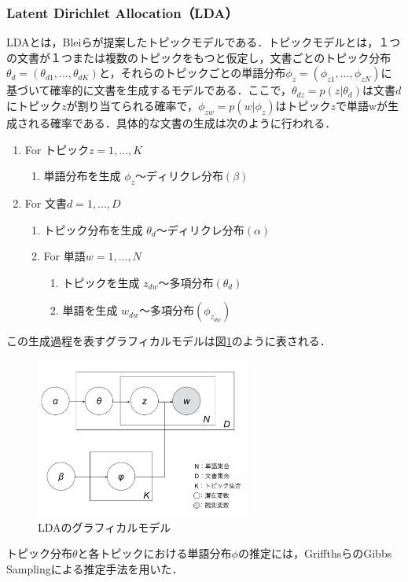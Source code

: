 \documentclass[a4paper,11pt,oneside,openany]{jsbook}
\begin{document}
		\subsubsection{Latent Dirichlet Allocation（LDA）}
LDA\cite{Blei}とは，Bleiらが提案したトピックモデルである．トピックモデルとは，１つの文書が１つまたは複数のトピックをもつと仮定し，文書ごとのトピック分布$\theta_{d} = (\theta_{d1},...,\theta_{dK})$と，それらのトピックごとの単語分布$\phi_{z} = (\phi_{z1},...,\phi_{zN})$に基づいて確率的に文書を生成するモデルである．ここで，$\theta_{dz} = p(z|\theta_{d})$は文書$d$にトピック$z$が割り当てられる確率で，$\phi_{zw} = p(w|\phi_{z})$はトピック$z$で単語wが生成される確率である．具体的な文書の生成は次のように行われる．
\begin{enumerate}
\item For トピック$z = 1, ... , K$
	\begin{enumerate}
	\setlength{\itemindent}{2cm}
 	\item 単語分布を生成 $\phi_{z} 〜 ディリクレ分布(\beta)$
	\end{enumerate}
\item For 文書$d = 1, ... ,D$
	\begin{enumerate}
	\setlength{\itemindent}{2cm}
 	\item トピック分布を生成 $\theta_{d} 〜 ディリクレ分布(\alpha)$
	\setlength{\itemindent}{2cm}
 	\item For 単語$w = 1, ... ,N$
		\begin{enumerate}
		\setlength{\itemindent}{3cm}
		\item トピックを生成 $z_{dw} 〜 多項分布(\theta_{d})$
		\setlength{\itemindent}{3cm}
		\item 単語を生成 $w_{dw} 〜 多項分布(\phi_{z_{dw}})$
		\end{enumerate}
	\end{enumerate}


\end{enumerate}

この生成過程を表すグラフィカルモデルは図\ref{fig:lda}のように表される．
\begin{figure}[tb]
	\begin{center} %
		\includegraphics[width = 70mm]{figures/LDA.pdf} %
	\end{center}
	\caption{LDAのグラフィカルモデル} %
	\label{fig:lda} %
\end{figure}
トピック分布$\theta$と各トピックにおける単語分布$\phi$の推定には，GriffthsらのGibbs Samplingによる推定手法を用いた\cite{gibbs}．
\end{document}
